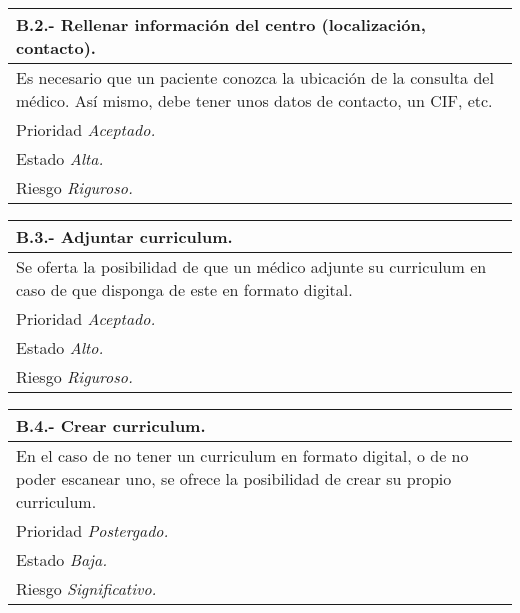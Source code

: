 \documentclass[a4paper,oneside,11pt]{book}
\begin{document}
\begin{center}
\begin{tabulary}{15cm}{|L|}
	\hline
		\bf{B.2.- Rellenar información del centro (localización, contacto).} \\
	\hline
		Es necesario que un paciente conozca la ubicación de la consulta del médico. Así mismo, debe tener unos datos de contacto, un CIF, etc. \\
	\hline
		Prioridad \textit{Aceptado.} \\
	\hline
		Estado \textit{Alta.} \\
	\hline
		Riesgo \textit{Riguroso.} \\
	\hline
\end{tabulary}
\end{center}

\begin{center}
\begin{tabulary}{15cm}{|L|}
	\hline
		\bf{B.3.- Adjuntar curriculum.} \\
	\hline
		Se oferta la posibilidad de que un médico adjunte su curriculum en caso de que disponga de este en formato digital. \\ 
	\hline
		Prioridad \textit{Aceptado.} \\
	\hline
		Estado \textit{Alto.} \\
	\hline
		Riesgo \textit{Riguroso.} \\
	\hline
\end{tabulary}
\end{center}

\begin{center}
\begin{tabulary}{15cm}{|L|}
	\hline
		\bf{B.4.- Crear curriculum.} \\
	\hline
		En el caso de no tener un curriculum en formato digital, o de no poder escanear uno, se ofrece la posibilidad de crear su propio curriculum. \\
	\hline
		Prioridad \textit{Postergado.} \\
	\hline
		Estado \textit{Baja.} \\
	\hline
		Riesgo \textit{Significativo.} \\
	\hline
\end{tabulary}
\end{center}
\end{document}
